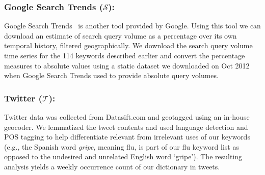 \subsubsection{Google Search Trends ($\mathcal{S}$):} Google Search Trends~\cite{GST:2013} is
another tool provided by Google. Using this tool we can download an estimate of
search query volume as a percentage over its own temporal history, filtered
geographically. We download
the search query volume time series for the 114 keywords described earlier
and convert the percentage measures to
absolute values using a static dataset we downloaded on Oct 2012 when Google
Search Trends used to provide absolute query volumes. 

\subsubsection{Twitter ($\mathcal{T}$):} 
Twitter data was collected from Datasift.com
and geotagged using an in-house geocoder. We lemmatized the tweet
contents and used language detection and POS tagging to help differentiate relevant
from irrelevant uses of our keywords 
(e.g., the Spanish word
{\it gripe}, meaning flu, is part of our flu keyword list as opposed to the undesired
and unrelated English word `gripe'). The resulting analysis yields a weekly occurrence
count of our dictionary in tweets.
%

